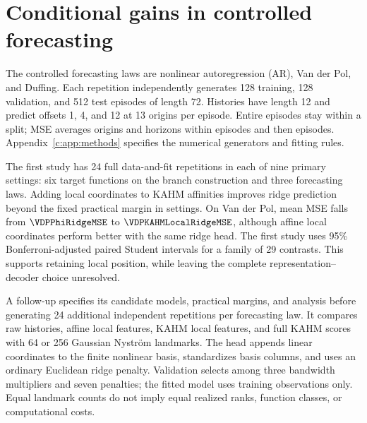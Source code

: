\section{Conditional gains in controlled forecasting}\label{c:sec:capacity}

The controlled forecasting laws are nonlinear autoregression (AR),
Van der Pol, and Duffing. Each repetition independently generates 128
training, 128 validation, and 512 test episodes of length 72. Histories
have length 12 and predict offsets 1, 4, and 12 at 13 origins per episode.
Entire episodes stay within a split; MSE averages origins and horizons
within episodes and then episodes. Appendix~\ref{c:app:methods} specifies
the numerical generators and fitting rules.

The first study has 24 full data-and-fit repetitions in each of nine
primary settings: six target functions on the branch construction and three forecasting laws. Adding
local coordinates to KAHM affinities improves ridge prediction beyond the
fixed practical margin in \LocalPracticalBenefitCount{} settings. On Van
der Pol, mean MSE falls from $\VDPPhiRidgeMSE$ to
$\VDPKAHMLocalRidgeMSE$, although affine local coordinates perform better
with the same ridge head. The first study uses 95\% Bonferroni-adjusted paired Student intervals
for a family of 29 contrasts. This supports retaining local position,
while leaving the complete representation--decoder choice unresolved.

A follow-up specifies its candidate models, practical margins, and
analysis before generating 24 additional independent repetitions per
forecasting law. It compares raw histories, affine local features, KAHM local features,
and full KAHM scores with 64 or 256 Gaussian Nystr\"om landmarks. The
head appends linear coordinates to the finite nonlinear basis, standardizes
basis columns, and uses an ordinary Euclidean ridge penalty. Validation
selects among three bandwidth multipliers and seven penalties; the fitted
model uses training observations only. Equal landmark counts do not imply
equal realized ranks, function classes, or computational costs.

\begin{table}[t]
 \caption{The twelve primary comparisons of finite-decoder capacity. Entries are
 mean MSEs and paired differences over 24 independent full repetitions,
 multiplied by $10^3$; $\Delta$ is control minus KAHM-local loss. Intervals
 use the follow-up's separate 95\% Bonferroni paired Student family.
 Coverage relies on normality or its approximation for paired differences;
 these are not distribution-free guarantees.}
 \label{c:tab:capacity}
 \centering\small\setlength{\tabcolsep}{3pt}
 
\end{table}

